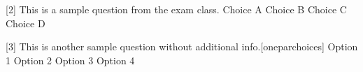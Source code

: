\documentclass[answers]{exam}
\newcommand{\enablemetadata}{\toggletrue{printmetadata}}
\begin{document}
\enablemetadata

\begin{questions}

\begin{metaquestion}{[2] This is a sample question from the exam class.}
    \choice Choice A
    \CorrectChoice Choice B
    \choice Choice C
    \choice Choice D
\end{metaquestion}

\begin{metaquestion}[2][Medium][0.7][] {[3] This is another sample question without additional info.}[oneparchoices]
    \choice Option 1
    \choice Option 2
    \choice Option 3
    \CorrectChoice Option 4
\end{metaquestion}

\end{questions}
\end{document}
